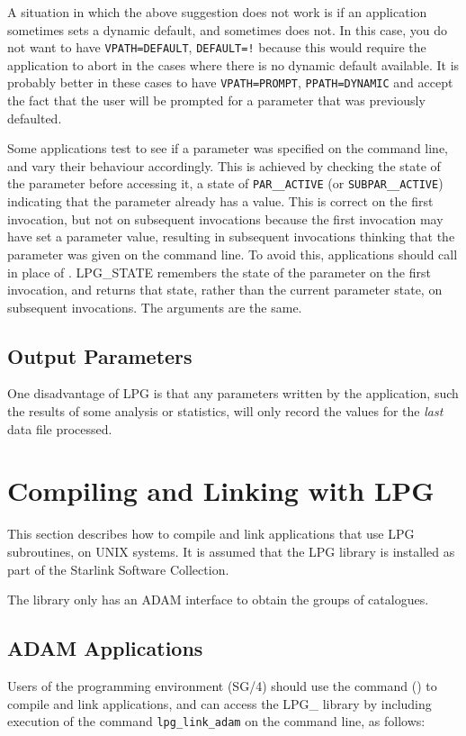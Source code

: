 \documentclass[twoside,11pt]{starlink}
\begin{document}
A situation in which the above suggestion does not work is if an
application sometimes sets a dynamic default, and sometimes does not.
In this case, you do not want to have \texttt{VPATH=DEFAULT},
\texttt{DEFAULT=!} because this would require the application to abort in the
cases where there is no dynamic default available.  It is probably
better in these cases to have \texttt{VPATH=PROMPT}, \texttt{PPATH=DYNAMIC}
and accept the fact that the user will be prompted for a parameter
that was previously defaulted.

Some applications test to see if a parameter was specified on the
command line, and vary their behaviour accordingly.  This is achieved
by checking the state of the parameter before accessing it, a state of
\texttt{PAR\_\_ACTIVE} (or \texttt{SUBPAR\_\_ACTIVE}) indicating that the
parameter already has a value.  This is correct on the first
invocation, but not on subsequent invocations because the first
invocation may have set a parameter value, resulting in subsequent
invocations thinking that the parameter was given on the command
line.  To avoid this, applications should call
 in place of
.  LPG\_STATE remembers the state of
the parameter on the first invocation, and returns that state, rather
than the current parameter state, on subsequent invocations.  The
arguments are the same.

\subsection{Output Parameters}

One disadvantage of LPG is that any parameters written by the
application, such the results of some analysis or statistics,
will only record the values for the \emph{last} data file processed.

\section {Compiling and Linking with LPG}

This section describes how to compile and link applications that use
LPG subroutines, on UNIX systems. It is assumed that the LPG library
is installed as part of the Starlink Software Collection.

The library only has an ADAM interface to obtain the groups of
catalogues.

\subsection{\label{ss:buildingadamapplications}ADAM Applications}
Users of the  programming environment
(SG/4) should use
the  command
() to compile and link applications, and can
access the LPG\_ library by including execution of the command
\texttt{lpg\_link\_adam} on the command line, as follows:
\end{document}
